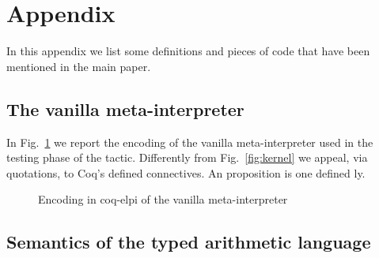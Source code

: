 
\section{Appendix}
\label{sec:app}

In this appendix we list some definitions and pieces of code that have been mentioned in the main paper.

\subsection{The vanilla meta-interpreter}


In Fig.~\ref{fig:interp} we report the encoding of the vanilla meta-interpreter used in
the testing phase of the  tactic. Differently from Fig.~\ref{fig:kernel} we appeal, via quotations, to Coq's defined connectives. An  proposition is one defined ly. %

\begin{figure}


\caption{Encoding in coq-elpi of the vanilla meta-interpreter}
\label{fig:interp}
%
%
\end{figure}

\subsection{Semantics of the typed arithmetic language}
\label{ssec:types}

